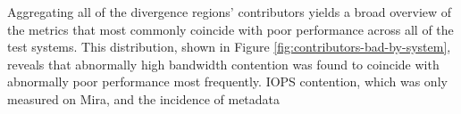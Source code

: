 Aggregating all of the divergence regions' contributors yields a broad overview of the metrics that most commonly coincide with poor performance across all of the test systems.
This distribution, shown in Figure \ref{fig:contributors-bad-by-system}, reveals that abnormally high bandwidth contention was found to coincide with abnormally poor performance most frequently.
IOPS contention, which was only measured on Mira, and the incidence of metadata 

